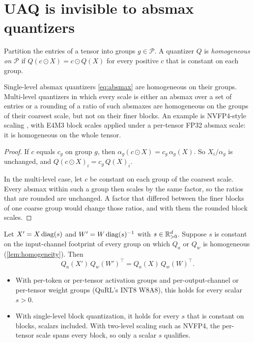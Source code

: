 \section{UAQ is invisible to absmax quantizers}\label{sec:invariance}

\begin{definition}\label{def:homogeneous}
Partition the entries of a tensor into groups $g\in\mathcal P$. A quantizer $Q$ is \emph{homogeneous on $\mathcal P$} if $Q(c\odot X)=c\odot Q(X)$ for every positive $c$ that is constant on each group.
\end{definition}

\begin{lemma}\label{lem:homogeneity}
Single-level absmax quantizers \eqref{eq:absmax} are homogeneous on their groups. Multi-level quantizers in which every scale is either an absmax over a set of entries or a rounding of a ratio of such absmaxes are homogeneous on the groups of their coarsest scale, but not on their finer blocks. An example is NVFP4-style scaling \citep{nvidia2025nvfp4}, with E4M3 block scales applied under a per-tensor FP32 absmax scale: it is homogeneous on the whole tensor.
\end{lemma}

\begin{proof}
If $c$ equals $c_g$ on group $g$, then $\alpha_g(c\odot X)=c_g\,\alpha_g(X)$. So $X_i/\alpha_g$ is unchanged, and $Q(c\odot X)_i=c_g\,Q(X)_i$.

In the multi-level case, let $c$ be constant on each group of the coarsest scale. Every absmax within such a group then scales by the same factor, so the ratios that are rounded are unchanged. A factor that differed between the finer blocks of one coarse group would change those ratios, and with them the rounded block scales.
\end{proof}

\begin{theorem}[Invariance]\label{thm:invariance}
Let $X'=X\operatorname{diag}(s)$ and $W'=W\operatorname{diag}(s)^{-1}$ with $s\in\mathbb{R}^d_{>0}$. Suppose $s$ is constant on the input-channel footprint of every group on which $Q_a$ or $Q_w$ is homogeneous (\cref{lem:homogeneity}). Then
\[
Q_a(X')\,Q_w(W')^\top=Q_a(X)\,Q_w(W)^\top .
\]
\begin{itemize}[leftmargin=*,itemsep=1pt]
\item With per-token or per-tensor activation groups and per-output-channel or per-tensor weight groups (QuRL's INT8 W8A8), this holds for every scalar $s>0$.
\item With single-level block quantization, it holds for every $s$ that is constant on blocks, scalars included. With two-level scaling such as NVFP4, the per-tensor scale spans every block, so only a scalar $s$ qualifies.
\end{itemize}
\end{theorem}

